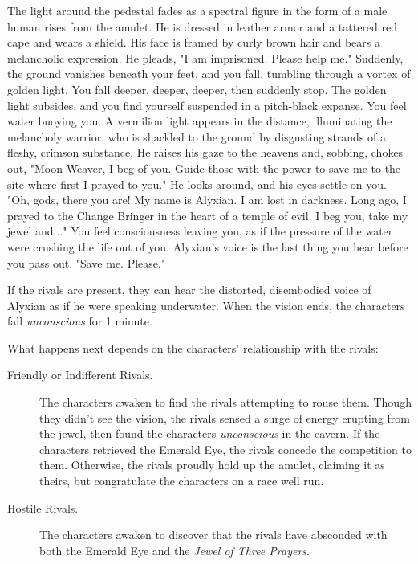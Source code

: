 \documentclass[a4paper, 11pt, bg=full, twocolumn, nooutline]{dndbook}
\begin{document}
\begin{DndReadAloud}
The light around the pedestal fades as a spectral figure in the form of a male human rises from the amulet. He is dressed in leather armor and a tattered red cape and wears a shield. His face is framed by curly brown hair and bears a melancholic expression. He pleads, "I am imprisoned. Please help me."
Suddenly, the ground vanishes beneath your feet, and you fall, tumbling through a vortex of golden light. You fall deeper, deeper, deeper, then suddenly stop. The golden light subsides, and you find yourself suspended in a pitch-black expanse. You feel water buoying you. A vermilion light appears in the distance, illuminating the melancholy warrior, who is shackled to the ground by disgusting strands of a fleshy, crimson substance.
He raises his gaze to the heavens and, sobbing, chokes out, "Moon Weaver, I beg of you. Guide those with the power to save me to the site where first I prayed to you." He looks around, and his eyes settle on you. "Oh, gods, there you are! My name is Alyxian. I am lost in darkness. Long ago, I prayed to the Change Bringer in the heart of a temple of evil. I beg you, take my jewel and..."
You feel consciousness leaving you, as if the pressure of the water were crushing the life out of you. Alyxian's voice is the last thing you hear before you pass out. "Save me. Please."
\end{DndReadAloud}

If the rivals are present, they can hear the distorted, disembodied voice of Alyxian as if he were speaking underwater. When the vision ends, the characters fall \textit{unconscious} for 1 minute.

What happens next depends on the characters' relationship with the rivals:

\begin{description}
\item[Friendly or Indifferent Rivals.] The characters awaken to find the rivals attempting to rouse them. Though they didn't see the vision, the rivals sensed a surge of energy erupting from the jewel, then found the characters \textit{unconscious} in the cavern. If the characters retrieved the Emerald Eye, the rivals concede the competition to them. Otherwise, the rivals proudly hold up the amulet, claiming it as theirs, but congratulate the characters on a race well run.
\item[Hostile Rivals.] The characters awaken to discover that the rivals have absconded with both the Emerald Eye and the \textit{Jewel of Three Prayers}.
\end{description}
\end{document}
